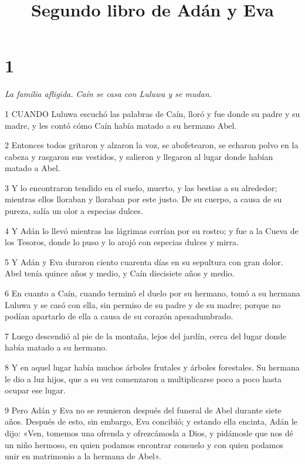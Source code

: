 

\title{Segundo libro de Adán y Eva}

\chapter{1}

\par \textit{La familia afligida. Caín se casa con Luluwa y se mudan.}

\par 1 CUANDO Luluwa escuchó las palabras de Caín, lloró y fue donde su padre y su madre, y les contó cómo Caín había matado a su hermano Abel.

\par 2 Entonces todos gritaron y alzaron la voz, se abofetearon, se echaron polvo en la cabeza y rasgaron sus vestidos, y salieron y llegaron al lugar donde habían matado a Abel.

\par 3 Y lo encontraron tendido en el suelo, muerto, y las bestias a su alrededor; mientras ellos lloraban y lloraban por este justo. De su cuerpo, a causa de su pureza, salía un olor a especias dulces.

\par 4 Y Adán lo llevó mientras las lágrimas corrían por su rostro; y fue a la Cueva de los Tesoros, donde lo puso y lo arojó con especias dulces y mirra.

\par 5 Y Adán y Eva duraron ciento cuarenta días en su sepultura con gran dolor. Abel tenía quince años y medio, y Caín diecisiete años y medio.

\par 6 En cuanto a Caín, cuando terminó el duelo por su hermano, tomó a su hermana Luluwa y se casó con ella, sin permiso de su padre y de su madre; porque no podían apartarlo de ella a causa de su corazón apesadumbrado.

\par 7 Luego descendió al pie de la montaña, lejos del jardín, cerca del lugar donde había matado a su hermano.

\par 8 Y en aquel lugar había muchos árboles frutales y árboles forestales. Su hermana le dio a luz hijos, que a su vez comenzaron a multiplicarse poco a poco hasta ocupar ese lugar.

\par 9 Pero Adán y Eva no se reunieron después del funeral de Abel durante siete años. Después de esto, sin embargo, Eva concibió; y estando ella encinta, Adán le dijo: «Ven, tomemos una ofrenda y ofrezcámosla a Dios, y pidámosle que nos dé un niño hermoso, en quien podamos encontrar consuelo y con quien podamos unir en matrimonio a la hermana de Abel».

